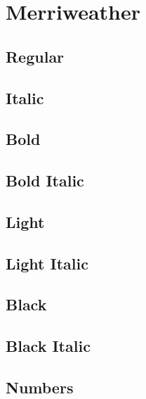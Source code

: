 \documentclass{article}
\begin{document}
\section{Merriweather}
\subsection*{Regular}
\lipsum[1]

\subsection*{Italic}
\textit{\lipsum[2]}


\subsection*{Bold}
\textbf{\lipsum[3]}

\subsection*{Bold Italic}

\textbf{\textit{\lipsum[4]}}

\subsection*{Light}

{\merriweatherlight\lipsum[5]}


\subsection*{Light Italic}

\textit{\merriweatherlight\lipsum[6]}

\subsection*{Black}

{\merriweatherblack\lipsum[7]}


\subsection*{Black Italic}

\textit{\merriweatherblack\lipsum[8]}

\subsection*{Numbers}
\end{document}
